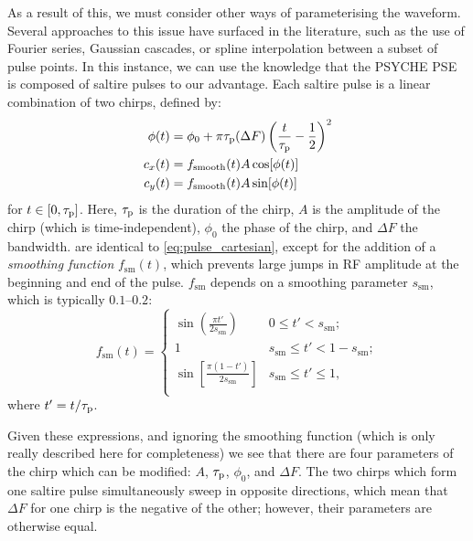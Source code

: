 As a result of this, we must consider other ways of parameterising the waveform.
Several approaches to this issue have surfaced in the literature, such as the use of Fourier series\autocite{Geen1991JMR,Kupce1995JMRSB}, Gaussian cascades\autocite{Emsley1990CPL}, or spline interpolation between a subset of pulse points\autocite{Ewing1990CP}.
In this instance, we can use the knowledge that the PSYCHE PSE is composed of saltire pulses to our advantage.
Each saltire pulse is a linear combination of two chirps, defined by:
\begin{align}
    \phi(t) &= \phi_0 + \pi\tau_\mathrm{p}(\Delta F)\left(\frac{t}{\tau_\mathrm{p}} - \frac{1}{2}\right)^2 \label{eq:chirp_pulse_phase} \\
    c_x(t) &= f_\text{smooth}(t) A \cos[\phi(t)] \label{eq:chirp_pulse_cx} \\
    c_y(t) &= f_\text{smooth}(t) A \sin[\phi(t)] \label{eq:chirp_pulse_cy}
\end{align}
for $t \in [0, \tau_\mathrm{p}]$. Here, $\tau_\mathrm{p}$ is the duration of the chirp, $A$ is the amplitude of the chirp (which is time-independent), $\phi_0$ the phase of the chirp, and $\Delta F$ the bandwidth.
 are identical to \cref{eq:pulse_cartesian}, except for the addition of a \textit{smoothing function} $f_\text{sm}(t)$, which prevents large jumps in RF amplitude at the beginning and end of the pulse.
$f_\text{sm}$ depends on a smoothing parameter $s_\text{sm}$, which is typically $0.1$--$0.2$:
\begin{equation}
    \label{eq:sming_function}
    f_\text{sm}(t) = \begin{cases}
        \displaystyle \sin\left(\frac{\pi t'}{2 s_\text{sm}}\right) & 0 \leq t' < s_\text{sm}; \\
        \displaystyle 1 & s_\text{sm} \leq t' < 1 - s_\text{sm}; \\
        \displaystyle \sin\left[\frac{\pi (1 - t')}{2 s_\text{sm}}\right] & s_\text{sm} \leq t' \leq 1, \\
    \end{cases}
\end{equation}
where $t' = t/\tau_\mathrm{p}$.


Given these expressions, and ignoring the smoothing function (which is only really described here for completeness) we see that there are four parameters of the chirp which can be modified: $A$, $\tau_\mathrm{p}$, $\phi_0$, and $\Delta F$.
The two chirps which form one saltire pulse simultaneously sweep in opposite directions, which mean that $\Delta F$ for one chirp is the negative of the other; however, their parameters are otherwise equal.

